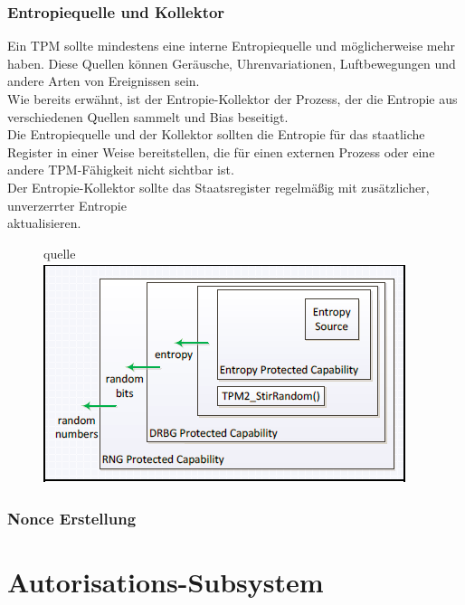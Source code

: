 \subsubsection{Entropiequelle und Kollektor}
Ein TPM sollte mindestens eine interne Entropiequelle und möglicherweise mehr haben. Diese Quellen können Geräusche, Uhrenvariationen, Luftbewegungen und andere Arten von Ereignissen sein.\\
Wie bereits erwähnt, ist der Entropie-Kollektor der Prozess, der die Entropie aus verschiedenen Quellen sammelt und Bias beseitigt.\\
Die Entropiequelle und der Kollektor sollten die Entropie für das staatliche Register in einer Weise bereitstellen, die für einen externen Prozess oder eine andere TPM-Fähigkeit nicht sichtbar ist.\\
Der Entropie-Kollektor sollte das Staatsregister regelmäßig mit zusätzlicher, unverzerrter Entropie\\ aktualisieren.
\begin{figure}[h]
   
\begin{center}
\huge quelle
\includegraphics[scale=1]{Abbildung2.PNG} 
\label{fig:strukturvorlage}
\label{fig2}

\end{center}

\end{figure}

\subsubsection{Nonce Erstellung}

\section{Autorisations-Subsystem}
